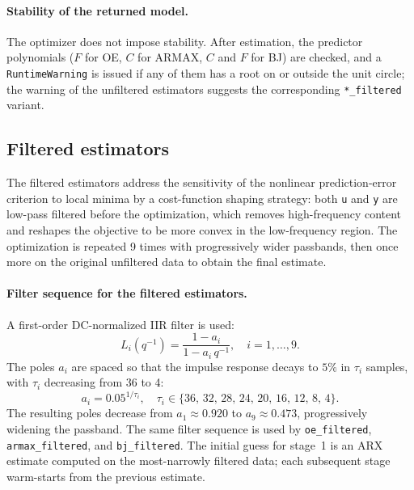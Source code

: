 \documentclass[11pt,a4paper]{article}
\begin{document}
\paragraph{Stability of the returned model.}
The optimizer does not impose stability.  After estimation, the
predictor polynomials ($F$ for OE, $C$ for ARMAX, $C$ and $F$ for BJ)
are checked, and a \texttt{RuntimeWarning} is issued if any of them has
a root on or outside the unit circle; the warning of the unfiltered
estimators suggests the corresponding \texttt{*\_filtered} variant.





\newpage
\subsection{Filtered estimators}

The filtered estimators address the sensitivity of the nonlinear
prediction-error criterion to local minima by a cost-function shaping
strategy: both \texttt{u} and \texttt{y} are low-pass filtered before
the optimization, which removes high-frequency content and reshapes the
objective to be more convex in the low-frequency region.  The
optimization is repeated 9 times with progressively wider passbands,
then once more on the original unfiltered data to obtain the final
estimate.

\paragraph{Filter sequence for the filtered estimators.}
A first-order DC-normalized IIR filter is used:
\[
  L_i(q^{-1}) = \frac{1 - a_i}{1 - a_i\,q^{-1}}, \quad i = 1,\ldots,9.
\]
The poles $a_i$ are spaced so that the impulse response decays to
$5\%$ in $\tau_i$ samples, with $\tau_i$ decreasing from 36 to 4:
\[
  a_i = 0.05^{1/\tau_i}, \quad
  \tau_i \in \{36,\,32,\,28,\,24,\,20,\,16,\,12,\,8,\,4\}.
\]
The resulting poles decrease from $a_1 \approx 0.920$ to
$a_9 \approx 0.473$, progressively widening the passband.
The same filter sequence is used by \texttt{oe\_filtered},
\texttt{armax\_filtered}, and \texttt{bj\_filtered}.  The initial
guess for stage~1 is an ARX estimate computed on the most-narrowly
filtered data; each subsequent stage warm-starts from the previous
estimate.




\end{document}
